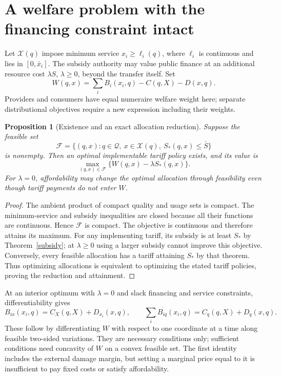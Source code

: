 \documentclass[11pt]{article}
\newtheorem{proposition}[theorem]{Proposition}
\theoremstyle{remark}
\begin{document}
\section{A welfare problem with the financing constraint intact}
Let $\mathcal X(q)$ impose minimum service $x_i\geq\ell_i(q)$, where $\ell_i$ is continuous and lies in $[0,\bar x_i]$. The subsidy authority may value public finance at an additional resource cost $\lambda S$, $\lambda\geq0$, beyond the transfer itself. Set
\[
 W(q,x)=\sum_iB_i(x_i,q)-C(q,X)-D(x,q).
\]
Providers and consumers have equal numeraire welfare weight here; separate distributional objectives require a new expression including their weights.

\begin{proposition}[Existence and an exact allocation reduction]\label{optimal}
Suppose the feasible set
\[
 \mathcal F=\{(q,x):q\in\mathcal Q,\ x\in\mathcal X(q),\ S_*(q,x)\leq\bar S\}
\]
is nonempty. Then an optimal implementable tariff policy exists, and its value is
\[
 \max_{(q,x)\in\mathcal F}\{W(q,x)-\lambda S_*(q,x)\}.
\]
For $\lambda=0$, affordability may change the optimal allocation through feasibility even though tariff payments do not enter $W$.
\end{proposition}
\begin{proof}
The ambient product of compact quality and usage sets is compact. The minimum-service and subsidy inequalities are closed because all their functions are continuous. Hence $\mathcal F$ is compact. The objective is continuous and therefore attains its maximum. For any implementing tariff, its subsidy is at least $S_*$ by Theorem~\ref{subsidy}; at $\lambda\geq0$ using a larger subsidy cannot improve this objective. Conversely, every feasible allocation has a tariff attaining $S_*$ by that theorem. Thus optimizing allocations is equivalent to optimizing the stated tariff policies, proving the reduction and attainment.
\end{proof}

At an interior optimum with $\lambda=0$ and slack financing and service constraints, differentiability gives
\[
 B_{ix}(x_i,q)=C_X(q,X)+D_{x_i}(x,q),\qquad
 \sum_iB_{iq}(x_i,q)=C_q(q,X)+D_q(x,q).
\]
These follow by differentiating $W$ with respect to one coordinate at a time along feasible two-sided variations. They are necessary conditions only; sufficient conditions need concavity of $W$ on a convex feasible set. The first identity includes the external damage margin, but setting a marginal price equal to it is insufficient to pay fixed costs or satisfy affordability.
\end{document}
